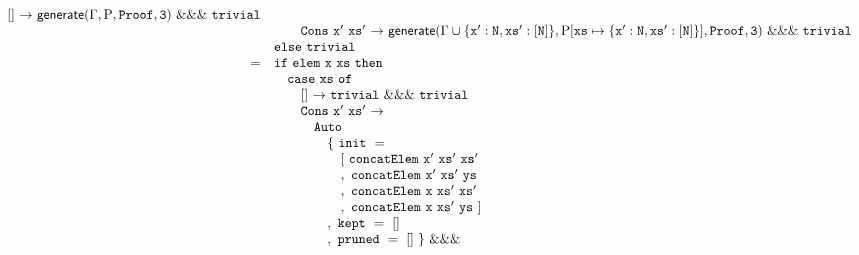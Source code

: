 \begin{figure*}
\begin{minipage}{\textwidth}
\begin{align*}
\begin{array}{rl}
            \mathtt{[]}~\mathtt{\rightarrow}~\mathsf{generate}(\Gamma, \mathrm{P}, \mathtt{Proof}, \mathtt{3})~\mathtt{\&\&\&}~\mathtt{trivial}
            \\& \hspace{2em}
            \mathtt{Cons~x'~xs'}~\mathtt{\rightarrow}~\mathsf{generate}(\Gamma\cup \{\mathtt{x'}:\mathtt{N}, \mathtt{xs'}:\mathtt{[N]}\}, \mathrm{P}[ \mathtt{xs} \mapsto \{ \mathtt{x'}:\mathtt{N}, \mathtt{xs'}:\mathtt{[N]} \} ], \mathtt{Proof}, \mathtt{3})~\mathtt{\&\&\&}~\mathtt{trivial}
        \\& \mathtt{else}~\mathtt{trivial}
      \\ =&
        \mathtt{if}~\mathtt{elem~x~xs}~\mathtt{then}
        \\& \hspace{1em} 
          \mathtt{case}~\mathtt{xs}~\mathtt{of}
          \\& \hspace{2em}
            \mathtt{[]}~\mathtt{\rightarrow}~\mathtt{trivial}~\mathtt{\&\&\&}~\mathtt{trivial}
            \\& \hspace{2em}
            \mathtt{Cons~x'~xs'}~\mathtt{\rightarrow}
            \\& \hspace{3em} \mathtt{Auto}
            \\& \hspace{4em} \mathtt{\{~init~=}
            \\& \hspace{5em} \mathtt{[~concatElem~x'~xs'~xs'}
            \\& \hspace{5em} \mathtt{,~concatElem~x'~xs'~ys}
            \\& \hspace{5em} \mathtt{,~concatElem~x~xs'~xs'}
            \\& \hspace{5em} \mathtt{,~concatElem~x~xs'~ys~]}
            \\& \hspace{4em} \mathtt{,~kept~=~[]}
            \\& \hspace{4em} \mathtt{,~pruned~=~[]~\}} ~ \mathtt{\&\&\&}

\end{array}
\end{align*}
\end{minipage}
\end{figure*}
